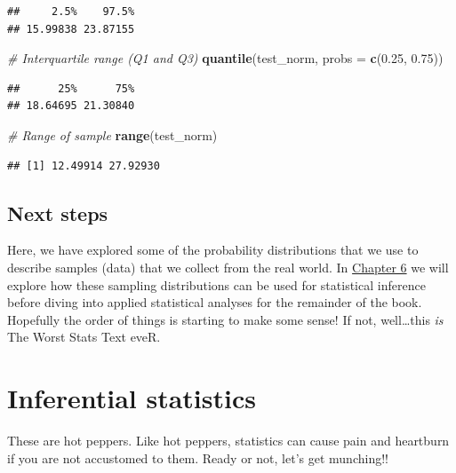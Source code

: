 \documentclass[
]{book}
\newenvironment{Shaded}{\begin{snugshade}}{\end{snugshade}}
\newcommand{\CommentTok}[1]{\textcolor[rgb]{0.56,0.35,0.01}{\textit{#1}}}
\newcommand{\DataTypeTok}[1]{\textcolor[rgb]{0.13,0.29,0.53}{#1}}
\newcommand{\FloatTok}[1]{\textcolor[rgb]{0.00,0.00,0.81}{#1}}
\newcommand{\KeywordTok}[1]{\textcolor[rgb]{0.13,0.29,0.53}{\textbf{#1}}}
\newcommand{\NormalTok}[1]{#1}
\begin{document}
\begin{verbatim}
##     2.5%    97.5% 
## 15.99838 23.87155
\end{verbatim}

\begin{Shaded}
\begin{Highlighting}[]
\CommentTok{# Interquartile range (Q1 and Q3)}
\KeywordTok{quantile}\NormalTok{(test_norm, }\DataTypeTok{probs =} \KeywordTok{c}\NormalTok{(}\FloatTok{0.25}\NormalTok{, }\FloatTok{0.75}\NormalTok{))    }
\end{Highlighting}
\end{Shaded}

\begin{verbatim}
##      25%      75% 
## 18.64695 21.30840
\end{verbatim}

\begin{Shaded}
\begin{Highlighting}[]
\CommentTok{# Range of sample}
\KeywordTok{range}\NormalTok{(test_norm)                             }
\end{Highlighting}
\end{Shaded}

\begin{verbatim}
## [1] 12.49914 27.92930
\end{verbatim}

\hypertarget{next5}{%
\section{Next steps}\label{next5}}

Here, we have explored some of the probability distributions that we use to describe samples (data) that we collect from the real world. In \protect\hyperlink{Chapter6}{Chapter 6} we will explore how these sampling distributions can be used for statistical inference before diving into applied statistical analyses for the remainder of the book. Hopefully the order of things is starting to make some sense! If not, well\ldots this \emph{is} The Worst Stats Text eveR.

\hypertarget{Chapter6}{%
\chapter{Inferential statistics}\label{Chapter6}}

These are hot peppers. Like hot peppers, statistics can cause pain and heartburn if you are not accustomed to them. Ready or not, let's get munching!!
\end{document}
